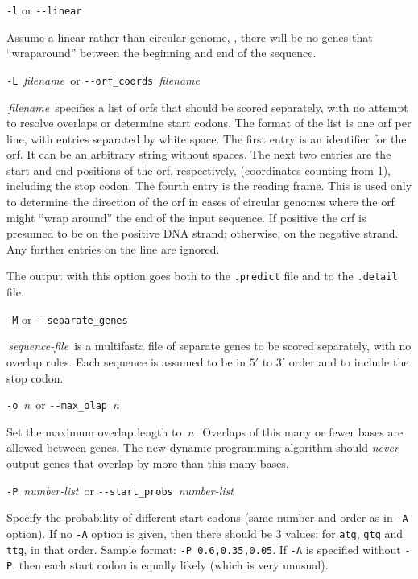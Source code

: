 \documentclass[fleqn,titlepage,11pt]{article}
\def\Desc#1{\,\mbox{\emph{#1}}\,}
\def\Pg#1{\texttt{#1}}
\begin{document}
\exdent
  \verb`-l` \enskip or \enskip \verb`--linear`

  Assume a linear rather than circular genome, \ie, there will
  be no genes that ``wraparound'' between the beginning and end
  of the sequence.

\exdent
  \verb`-L` \Desc{filename} \enskip or \enskip \verb`--orf_coords` \Desc{filename}

  \Desc{filename} specifies a list of orfs that should
  be scored separately, with no attempt to resolve overlaps or
  determine start codons.  The format of the
  list is one orf per line, with entries separated by white space.
  The first entry is an identifier for the orf.  It can be an
  arbitrary string without spaces.  The next two entries are
  the start and end positions of the orf, respectively, (coordinates counting
  from 1), including the stop codon.  The fourth entry is the
  reading frame.  This is used only to determine the direction of
  the orf in cases of circular genomes where the orf might ``wrap
  around'' the end of the input sequence.  If positive the
  orf is presumed to be on the positive DNA strand; otherwise,
  on the negative strand.  Any further entries on the line are ignored.

  The output with this option goes both to the \Pg{.predict} file
  and to the \Pg{.detail} file.

\exdent
  \verb`-M` \enskip or \enskip \verb`--separate_genes`

  \Desc{sequence-file} is a multifasta file of separate genes to
  be scored separately, with no overlap rules.  Each sequence
  is assumed to be in $5'$ to $3'$ order and to include the stop
  codon.

\exdent
  \verb`-o` \Desc{n} \enskip or \enskip \verb`--max_olap` \Desc{n}

  Set the maximum overlap length to \Desc{n}.  Overlaps of this
  many or fewer bases are allowed between genes.  The new
  dynamic programming algorithm should \underline{\emph{never}}
  output genes that overlap by more than this many bases.

\exdent
  \verb`-P` \Desc{number-list} \enskip or \enskip \verb`--start_probs` \Desc{number-list}

  Specify the probability of different start codons (same number and order
  as in \Pg{-A} option).  If no \Pg{-A} option is given, then there should be 3
  values:  for \Pg{atg}, \Pg{gtg} and \Pg{ttg},
  in that order.  Sample format:  \verb`-P 0.6,0.35,0.05`.
  If \Pg{-A} is specified without \Pg{-P}, then each start codon is equally likely
  (which is very unusual).
\end{document}
